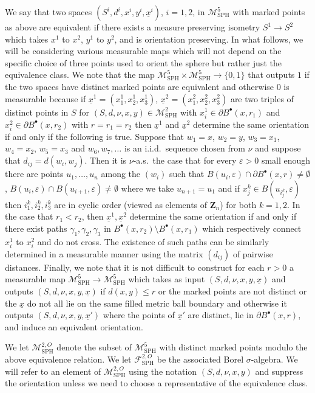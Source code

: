 \documentclass[JEP,XML,SOM,Unicode]{cedram}
\let\mathcal\mathscr
\newcommand{\sbullet}{{\scriptscriptstyle\bullet}}
\let\epsilon\varepsilon
\theoremstyle{plain}
\numberwithin{theorem}{section}
\theoremstyle{definition}
\newcommand\gmsspace{{\mathcal M}_{\mathrm{SPH}}}
\newcommand{\mmsigmaspho}{{\mathcal F}_{\mathrm{SPH}}^{2,O}}
\newcommand{\Z}{\mathbf{Z}}
\let\ul\underline
\newcommand{\fb}[2]{B^\sbullet(#1,#2)}
\begin{document}
We say that two spaces $(S^i,d^i,x^i,y^i,\ul{x}^i)$, $i=1,2$, in $\gmsspace^5$ with marked points as above are equivalent if there exists a measure preserving isometry $S^1 \to S^2$ which takes $x^1$ to $x^2$, $y^1$ to $y^2$, and is orientation preserving. In what follows, we will be considering various measurable maps which will not depend on the specific choice of three points used to orient the sphere but rather just the equivalence class. We note that the map $\gmsspace^5 \times \gmsspace^5 \to \{0,1\}$ that outputs $1$ if the two spaces have distinct marked points are equivalent and otherwise $0$ is measurable because if $\ul{x}^1 = (x_1^1,x_2^1,x_3^1)$, $\ul{x}^2 = (x_1^2,x_2^2,x_3^2)$ are two triples of distinct points in $S$ for $(S,d,\nu,x,y) \in \gmsspace^2$ with $x_i^1 \in \partial \fb{x}{r_1}$ and $x_i^2 \in \partial \fb{x}{r_2}$ with $r = r_1 = r_2$ then $\ul{x}^1$ and $\ul{x}^2$ determine the same orientation if and only if the following is true. Suppose that $w_1=x$, $w_2 = y$, $w_3=x_1$, $w_4=x_2$, $w_5 = x_3$ and $w_6,w_7,\ldots$ is an i.i.d.\ sequence chosen from $\nu$ and suppose that $d_{ij} = d(w_i,w_j)$. Then it is $\nu$-a.s.\ the case that for every $\epsilon > 0$ small enough there are points $u_1,\ldots,u_n$ among the $(w_i)$ such that $B(u_i,\epsilon) \cap \partial \fb{x}{r} \neq \emptyset$, $B(u_i,\epsilon) \cap B(u_{i+1},\epsilon) \neq \emptyset$ where we take $u_{n+1} = u_1$ and if $x_j^k \in B(u_{i_j^k},\epsilon)$ then $i_1^k,i_2^k,i_3^k$ are in cyclic order (viewed as elements of $\Z_n$) for both $k=1,2$. In the case that $r_1 < r_2$, then $\ul{x}^1, \ul{x}^2$ determine the same orientation if and only if there exist paths $\gamma_1,\gamma_2,\gamma_3$ in $\fb{x}{r_2} \setminus \fb{x}{r_1}$ which respectively connect $x_i^1$ to $x_i^2$ and do not cross. The existence of such paths can be similarly determined in a measurable manner using the matrix $(d_{ij})$ of pairwise distances. Finally, we note that it is not difficult to construct for each $r > 0$ a measurable map $\gmsspace^{5} \to \gmsspace^{5}$ which takes as input $(S,d,\nu,x,y,\ul{x})$ and outputs $(S,d,\nu,x,y,\ul{x})$ if $d(x,y) \leq r$ or the marked points are not distinct or the $\ul{x}$ do not all lie on the same filled metric ball boundary and otherwise it outputs $(S,d,\nu,x,y,\ul{x}')$ where the points of $\ul{x}'$ are distinct, lie in $\partial \fb{x}{r}$, and induce an equivalent orientation.

We let $\gmsspace^{2,O}$ denote the subset of $\gmsspace^5$ with distinct marked points modulo the above equivalence relation. We let $\mmsigmaspho$ be the associated Borel $\sigma$-algebra. We will refer to an element of $\gmsspace^{2,O}$ using the notation $(S,d,\nu,x,y)$ and suppress the orientation unless we need to choose a representative of the equivalence class.
\end{document}
